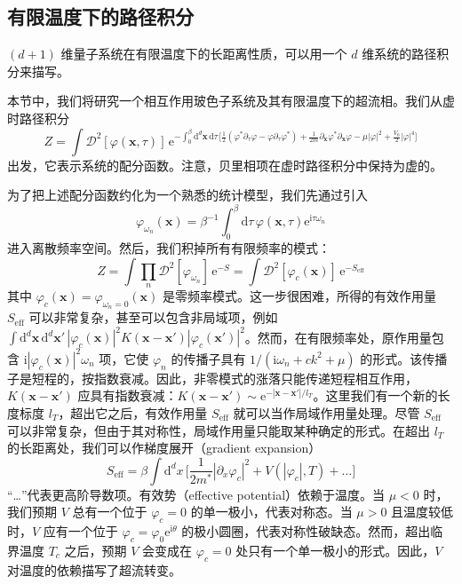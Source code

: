 \subsection{有限温度下的路径积分}

\begin{keypoints}
\item $(d+1)$ 维量子系统在有限温度下的长距离性质，可以用一个 $d$ 维系统的路径积分来描写。
\end{keypoints}

本节中，我们将研究一个相互作用玻色子系统及其有限温度下的超流相。我们从虚时路径积分
\begin{equation*}
Z=\int\mathcal{D}^2[\varphi(\pmb{x},\tau)]\,\mathrm{e}^{-\int_0^{\beta}\mathrm{d}^d\pmb{x}\,\mathrm{d}\tau\,\big[\frac{1}{2}(\varphi^*\partial_{\tau}\varphi-\varphi\partial_{\tau}\varphi^*)+\frac{1}{2m}\partial_{\pmb{x}}\varphi^*\partial_{\pmb{x}}\varphi-\mu|\varphi|^2+\frac{V_0}{2}|\varphi|^4\big]}
\end{equation*}
出发，它表示系统的配分函数。注意，贝里相项在虚时路径积分中保持为虚的。

为了把上述配分函数约化为一个熟悉的统计模型，我们先通过引入
\begin{equation*}
\varphi_{\omega_n}(\pmb{x})=\beta^{-1}\int_0^{\beta}\mathrm{d}\tau\,\varphi(\pmb{x},\tau)\mathrm{e}^{\mathrm{i}\tau\omega_n}
\end{equation*}
进入离散频率空间。然后，我们积掉所有有限频率的模式：
\begin{equation*}
Z=\int\prod_n\mathcal{D}^2[\varphi_{\omega_n}]\,\mathrm{e}^{-S}=\int\mathcal{D}^2[\varphi_c(\pmb{x})]\,\mathrm{e}^{-S_{\mathrm{eff}}}
\end{equation*}
其中 $\varphi_c(\pmb{x})=\varphi_{\omega_n=0}(\pmb{x})$ 是零频率模式。这一步很困难，所得的有效作用量 $S_{\mathrm{eff}}$ 可以非常复杂，甚至可以包含非局域项，例如 $\int\mathrm{d}^d\pmb{x}\,\mathrm{d}^d\pmb{x}'\,|\varphi_c(\pmb{x})|^2K(\pmb{x}-\pmb{x}')|\varphi_c(\pmb{x}')|^2$。然而，在有限频率处，原作用量包含 $\mathrm{i}|\varphi_c(\pmb{x})|^2\omega_n$ 项，它使 $\varphi_n$ 的传播子具有 $1/(\mathrm{i}\omega_n+ck^2+\mu)$ 的形式。该传播子是短程的，按指数衰减。因此，非零模式的涨落只能传递短程相互作用，$K(\pmb{x}-\pmb{x}')$ 应具有指数衰减：$K(\pmb{x}-\pmb{x}')\sim\mathrm{e}^{-|\pmb{x}-\pmb{x}'|/l_T}$。这里我们有一个新的长度标度 $l_T$，超出它之后，有效作用量 $S_{\mathrm{eff}}$ 就可以当作局域作用量处理。尽管 $S_{\mathrm{eff}}$ 可以非常复杂，但由于其对称性，局域作用量只能取某种确定的形式。在超出 $l_T$ 的长距离处，我们可以作梯度展开（gradient expansion）
\begin{equation*}
S_{\mathrm{eff}}=\beta\int\mathrm{d}^dx\,\big[\frac{1}{2m^*}|\partial_x\varphi_c|^2+V(|\varphi_c|,T)+\dots\big] \tag{3.4.1}
\end{equation*}
“…”代表更高阶导数项。有效势（effective potential）依赖于温度。当 $\mu<0$ 时，我们预期 $V$ 总有一个位于 $\varphi_c=0$ 的单一极小，代表对称态。当 $\mu>0$ 且温度较低时，$V$ 应有一个位于 $\varphi_c=\varphi_0\mathrm{e}^{\mathrm{i}\theta}$ 的极小圆圈，代表对称性破缺态。然而，超出临界温度 $T_c$ 之后，预期 $V$ 会变成在 $\varphi_c=0$ 处只有一个单一极小的形式。因此，$V$ 对温度的依赖描写了超流转变。

